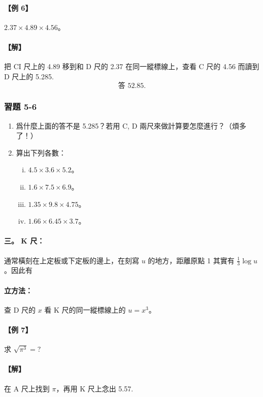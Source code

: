 \paragraph{【例 6】} $2.37 \times 4.89 \times 4.56$。

\paragraph{【解】}
把 CI 尺上的 4.89 移到和 D 尺的 2.37 在同一縱標線上，查看 C 尺的 4.56 而讀到 D 尺上的 5.285.
\[
\text{答 } 52.85.
\]

\subsubsection*{習題 5-6}
\begin{enumerate}
    \item 爲什麼上面的答不是 5.285？若用 C, D 兩尺來做計算要怎麼進行？（煩多了！）
    \item 算出下列各數：
    \begin{enumerate}[(i)]
        \item $4.5 \times 3.6 \times 5.2$。
        \item $1.6 \times 7.5 \times 6.9$。
        \item $1.35 \times 9.8 \times 4.75$。
        \item $1.66 \times 6.45 \times 3.7$。
    \end{enumerate}
\end{enumerate}

\paragraph{三。 K 尺：} 通常橫刻在上定板或下定板的邊上，在刻寫 $u$ 的地方，距離原點 1 其實有 $\frac{1}{3}\log u$。因此有 \\
\paragraph{立方法：} 查 D 尺的 $x$ 看 K 尺的同一縱標線上的 $u = x^3$。

\paragraph{【例 7】} 求 $\sqrt{\pi^3} = ?$

\paragraph{【解】}
在 A 尺上找到 $\pi$，再用 K 尺上念出 5.57.

